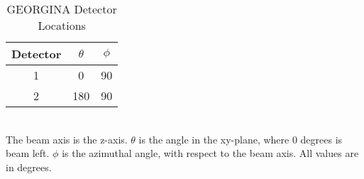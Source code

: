 \begin{table}[]
    \centering
    \caption{GEORGINA Detector Locations}
    \label{tab:GEORGE_Det_Loc}
    \begin{tabular}{c|c|c} \toprule
         Detector & $\theta$ & $\phi$  \\
         \hline
         1 & 0 & 90 \\ 
         2 & 180 & 90\\ \bottomrule
    \end{tabular}
    \\[2pt]
    \footnotesize
    The beam axis is the z-axis. $\theta$ is the angle in the xy-plane, where 0 degrees is beam left. $\phi$ is the azimuthal angle, with respect to the beam axis. All values are in degrees.
\end{table}